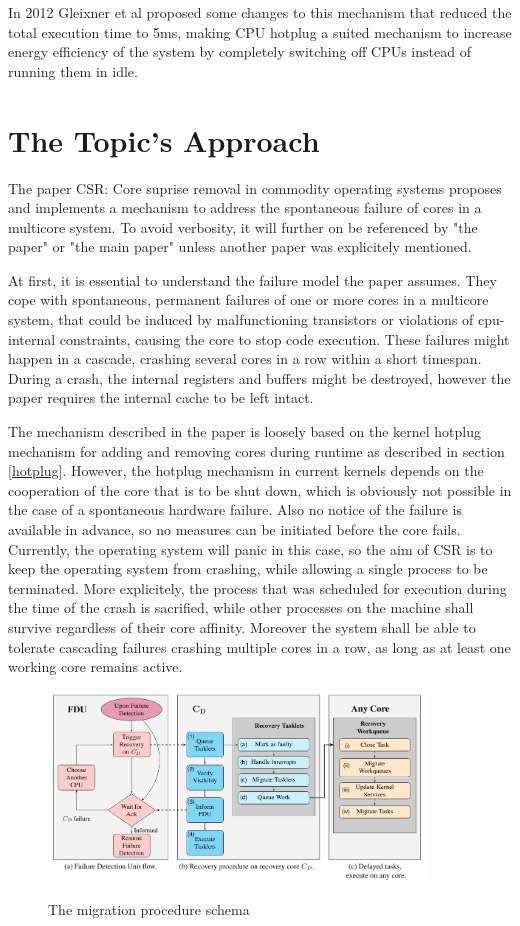 \documentclass[a4paper,10pt,twoside]{article}
\begin{document}
In 2012 Gleixner et al proposed some changes \cite{Efficient_Hotplug} to this mechanism that reduced the total execution time to 5ms, making CPU hotplug a suited mechanism to increase energy efficiency of the system by completely switching off CPUs instead of running them in idle.

\section{The Topic's Approach}
The paper CSR: Core suprise removal in commodity operating systems \cite{CSR} proposes and implements a mechanism to address the spontaneous failure of cores in a multicore system. To avoid verbosity, it will further on be referenced by "the paper" or "the main paper" unless another paper was explicitely mentioned.

At first, it is essential to understand the failure model the paper assumes. They cope with spontaneous, permanent failures of one or more cores in a multicore system, that could be induced by malfunctioning transistors or violations of cpu-internal constraints, causing the core to stop code execution. These failures might happen in a cascade, crashing several cores in a row within a short timespan. During a crash, the internal registers and buffers might be destroyed, however the paper requires the internal cache to be left intact.

The mechanism described in the paper is loosely based on the kernel hotplug mechanism for adding and removing cores during runtime as described in section \ref{hotplug}. However, the hotplug mechanism in current kernels depends on the cooperation of the core that is to be shut down, which is obviously not possible in the case of a spontaneous hardware failure. Also no notice of the failure is available in advance, so no measures can be initiated before the core fails. Currently, the operating system will panic in this case, so the aim of CSR is to keep the operating system from crashing, while allowing a single process to be terminated. More explicitely, the process that was scheduled for execution during the time of the crash is sacrified, while other processes on the machine shall survive regardless of their core affinity. Moreover the system shall be able to tolerate cascading failures crashing multiple cores in a row, as long as at least one working core remains active.

\begin{figure}[t]
	\caption{The migration procedure schema}
	\includegraphics[width=10cm]{recovery_procedure}
	\centering
	\label{fig:migration}
\end{figure}
\end{document}
